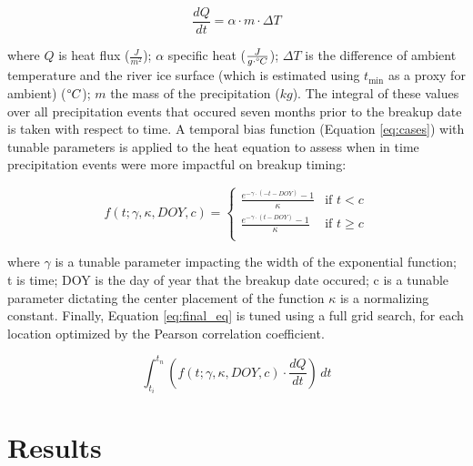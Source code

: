 \documentclass[draft]{AR_analysis_}
\begin{document}
\begin{equation}
\frac{dQ}{dt} = \alpha \cdot m \cdot \Delta T 
	\label{eq:heat_transport}
\end{equation}

\noindent where $Q$ is heat flux ($\frac{J}{m^2}$); $\alpha$ specific heat 
($\frac{J}{g \cdot \degree C}$); $\Delta T$ is the difference of 
ambient temperature and the river ice surface (which is estimated 
using $t_{\text{min}}$ as a proxy for ambient) ($\degree C$); $m$ 
the mass of the precipitation ($kg$). The integral of these values
over all precipitation events that occured seven months prior to the
breakup date is taken with respect to time. A temporal bias function
(Equation \ref{eq:cases})
with tunable parameters is applied to the heat equation to assess when in
time precipitation events were more impactful on breakup timing:

\begin{equation}
	\label{eq:cases}
	f(t; \gamma, \kappa, DOY, c) =
	\begin{cases}
    	\frac{e^{-\gamma \cdot (-t - DOY)} - 1}{\kappa} & \text{if }
        	t < c \\
    	\frac{e^{-\gamma \cdot (t - DOY)} - 1}{\kappa} & \text{if }
        	t \geq c \\
	\end{cases}
\end{equation}

\noindent where $\gamma$ is a tunable parameter impacting the width of
the exponential function; t is time; DOY is the day of year
that the breakup date occured; c is a tunable parameter dictating the
center placement of the function $\kappa$ is a normalizing constant.
Finally, Equation \ref{eq:final_eq} is tuned using a full grid search, for each
location optimized by the Pearson correlation coefficient. 

\begin{equation}
\label{eq:final_eq}
	\int_{t_i}^{t_n} \left(f(t; \gamma, \kappa, DOY, c) \cdot
	\frac{dQ}{dt}\right) \, dt
\end{equation}



\section{Results} 
\end{document}
